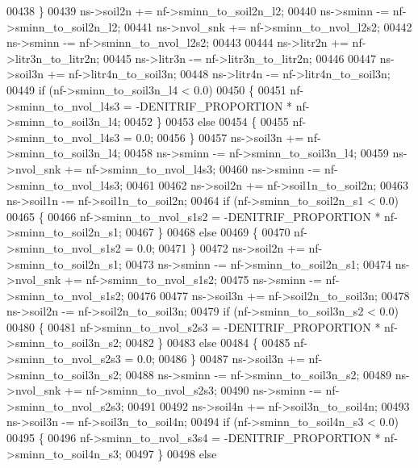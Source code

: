 \begin{DoxyCode}
{00438     \}
00439     ns->soil2n     += nf->sminn\_to\_soil2n\_l2;
00440     ns->sminn      -= nf->sminn\_to\_soil2n\_l2;
00441     ns->nvol\_snk   += nf->sminn\_to\_nvol\_l2s2;
00442     ns->sminn      -= nf->sminn\_to\_nvol\_l2s2;
00443     
00444     ns->litr2n     += nf->litr3n\_to\_litr2n;
00445     ns->litr3n     -= nf->litr3n\_to\_litr2n;
00446     
00447     ns->soil3n     += nf->litr4n\_to\_soil3n;
00448     ns->litr4n     -= nf->litr4n\_to\_soil3n;
00449     \textcolor{keywordflow}{if} (nf->sminn\_to\_soil3n\_l4 < 0.0)
00450     \{
00451         nf->sminn\_to\_nvol\_l4s3 = -DENITRIF\_PROPORTION * nf->sminn\_to\_soil3n\_l4;
00452     \}
00453     \textcolor{keywordflow}{else}
00454     \{
00455         nf->sminn\_to\_nvol\_l4s3 = 0.0;
00456     \}
00457     ns->soil3n     += nf->sminn\_to\_soil3n\_l4;
00458     ns->sminn      -= nf->sminn\_to\_soil3n\_l4;
00459     ns->nvol\_snk   += nf->sminn\_to\_nvol\_l4s3;
00460     ns->sminn      -= nf->sminn\_to\_nvol\_l4s3;
00461     
00462     ns->soil2n     += nf->soil1n\_to\_soil2n;
00463     ns->soil1n     -= nf->soil1n\_to\_soil2n;
00464     \textcolor{keywordflow}{if} (nf->sminn\_to\_soil2n\_s1 < 0.0)
00465     \{
00466         nf->sminn\_to\_nvol\_s1s2 = -DENITRIF\_PROPORTION * nf->sminn\_to\_soil2n\_s1;
00467     \}
00468     \textcolor{keywordflow}{else}
00469     \{
00470         nf->sminn\_to\_nvol\_s1s2 = 0.0;
00471     \}
00472     ns->soil2n     += nf->sminn\_to\_soil2n\_s1;
00473     ns->sminn      -= nf->sminn\_to\_soil2n\_s1;
00474     ns->nvol\_snk   += nf->sminn\_to\_nvol\_s1s2;
00475     ns->sminn      -= nf->sminn\_to\_nvol\_s1s2;
00476     
00477     ns->soil3n     += nf->soil2n\_to\_soil3n;
00478     ns->soil2n     -= nf->soil2n\_to\_soil3n;
00479     \textcolor{keywordflow}{if} (nf->sminn\_to\_soil3n\_s2 < 0.0)
00480     \{
00481         nf->sminn\_to\_nvol\_s2s3 = -DENITRIF\_PROPORTION * nf->sminn\_to\_soil3n\_s2;
00482     \}
00483     \textcolor{keywordflow}{else}
00484     \{
00485         nf->sminn\_to\_nvol\_s2s3 = 0.0;
00486     \}
00487     ns->soil3n     += nf->sminn\_to\_soil3n\_s2;
00488     ns->sminn      -= nf->sminn\_to\_soil3n\_s2;
00489     ns->nvol\_snk   += nf->sminn\_to\_nvol\_s2s3;
00490     ns->sminn      -= nf->sminn\_to\_nvol\_s2s3;
00491     
00492     ns->soil4n     += nf->soil3n\_to\_soil4n;
00493     ns->soil3n     -= nf->soil3n\_to\_soil4n;
00494     \textcolor{keywordflow}{if} (nf->sminn\_to\_soil4n\_s3 < 0.0)
00495     \{
00496         nf->sminn\_to\_nvol\_s3s4 = -DENITRIF\_PROPORTION * nf->sminn\_to\_soil4n\_s3;
00497     \}
00498     \textcolor{keywordflow}{else}
}
\end{DoxyCode}
